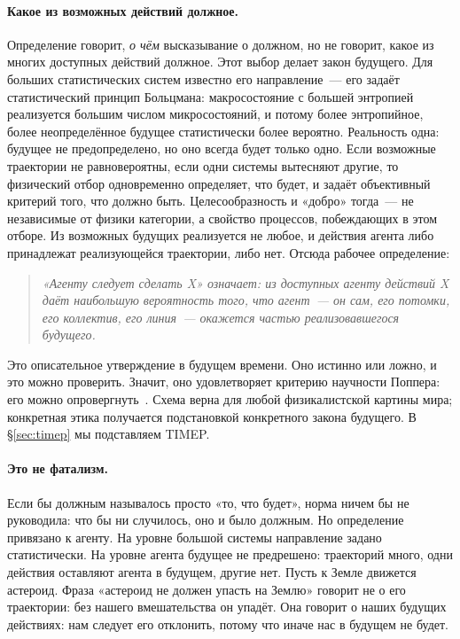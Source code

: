 \documentclass[11pt,a4paper]{article}
\newcommand{\Sref}[1]{\hyperref[#1]{\S\ref{#1}}}
\begin{document}
\paragraph{Какое из возможных действий должное.}
Определение говорит, \emph{о чём} высказывание о должном, но не говорит, какое из многих доступных действий должное. Этот выбор делает закон будущего. Для больших статистических систем известно его направление~--- его задаёт статистический принцип Больцмана: макросостояние с большей энтропией реализуется большим числом микросостояний, и потому более энтропийное, более неопределённое будущее статистически более вероятно. Реальность одна: будущее не предопределено, но оно всегда будет только одно. Если возможные траектории не равновероятны, если одни системы вытесняют другие, то физический отбор одновременно определяет, что будет, и задаёт объективный критерий того, что должно быть. Целесообразность и «добро» тогда~--- не независимые от физики категории, а свойство процессов, побеждающих в этом отборе. Из возможных будущих реализуется не любое, и действия агента либо принадлежат реализующейся траектории, либо нет. Отсюда рабочее определение:

\begin{quote}
\emph{«Агенту следует сделать X» означает: из доступных агенту действий X даёт наибольшую вероятность того, что агент~--- он сам, его потомки, его коллектив, его линия~--- окажется частью реализовавшегося будущего.}
\end{quote}

Это описательное утверждение в будущем времени. Оно истинно или ложно, и это можно проверить. Значит, оно удовлетворяет критерию научности Поппера: его можно опровергнуть~\cite{popper1959}. Схема верна для любой физикалистской картины мира; конкретная этика получается подстановкой конкретного закона будущего. В \Sref{sec:timep} мы подставляем TIMEP.

\paragraph{Это не фатализм.}
Если бы должным называлось просто «то, что будет», норма ничем бы не руководила: что бы ни случилось, оно и было должным. Но определение привязано к агенту. На уровне большой системы направление задано статистически. На уровне агента будущее не предрешено: траекторий много, одни действия оставляют агента в будущем, другие нет. Пусть к Земле движется астероид. Фраза «астероид не должен упасть на Землю» говорит не о его траектории: без нашего вмешательства он упадёт. Она говорит о наших будущих действиях: нам следует его отклонить, потому что иначе нас в будущем не будет.
\end{document}
